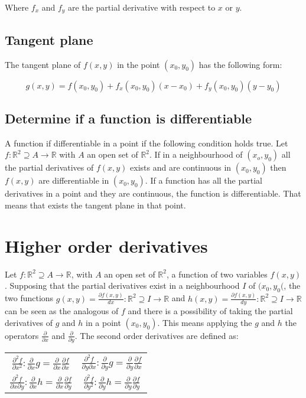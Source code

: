 	Where $f_x$ and $f_y$ are the partial derivative with respect to $x$ or $y$.

	\subsection{Tangent plane}
	The tangent plane of $f(x,y)$ in the point $(x_0, y_0)$ has the following form:

	$$g(x,y) = f(x_0, y_0) + f_x(x_0, y_0)(x-x_0) + f_y(x_0, y_0)(y-y_0)$$

	\subsection{Determine if a function is differentiable}
	A function if differentiable in a point if the following condition holds true.
	Let $f:\mathbb{R}^2\supseteq A\rightarrow \mathbb{R}$ with $A$ an open set of $\mathbb{R}^2$.
	If in a neighbourhood of $(x_o, y_0)$ all the partial derivatives of $f(x, y)$ exists and are continuous in $(x_0, y_0)$ then $f(x,y)$ are differentiable in $(x_0, y_0)$.
	If a function has all the partial derivatives in a point and they are continuous, the function is differentiable.
	That means that exists the tangent plane in that point.

\section{Higher order derivatives}
Let $f:\mathbb{R}^2\supseteq A\rightarrow\mathbb{R}$, with $A$ an open set of $\mathbb{R}^2$, a function of two variables $f(x,y)$.
Supposing that the partial derivatives exist in a neighbourhood $I$ of $(x_0, y_0($, the two functions $g(x,y) = \frac{\partial f(x,y)}{dx}:\mathbb{R}^2\supseteq I\rightarrow\mathbb{R}$ and $h(x,y) = \frac{\partial f(x,y)}{dy}:\mathbb{R}^2\supseteq I\rightarrow\mathbb{R}$ can be seen as the analogous of $f$ and there is a possibility of taking the partial derivatives of $g$ and $h$ in a point $(x_0, y_0)$.
This means applying the $g$ and $h$ the operators $\frac{\partial }{\partial x}$ and $\frac{\partial}{\partial y}$.
The second order derivatives are defined as:

\begin{table}[H]
	\begin{tabular}{c c}
		$\frac{\partial^2 f}{\partial x^2}: \frac{\partial}{\partial x}g = \frac{\partial}{\partial x}\frac{\partial f}{\partial x}$ &
		 $\frac{\partial^2 f}{\partial y\partial x}: \frac{\partial}{\partial y}g = \frac{\partial}{\partial y}\frac{\partial f}{\partial x}$ \\
		$\frac{\partial^2 f}{\partial x\partial y}: \frac{\partial}{\partial x}h = \frac{\partial}{\partial x}\frac{\partial f}{\partial y}$ &
		 $\frac{\partial^2 f}{\partial y^2}: \frac{\partial}{\partial y}h = \frac{\partial}{\partial y}\frac{\partial f}{\partial y}$\\
	\end{tabular}
	\centering
\end{table}

